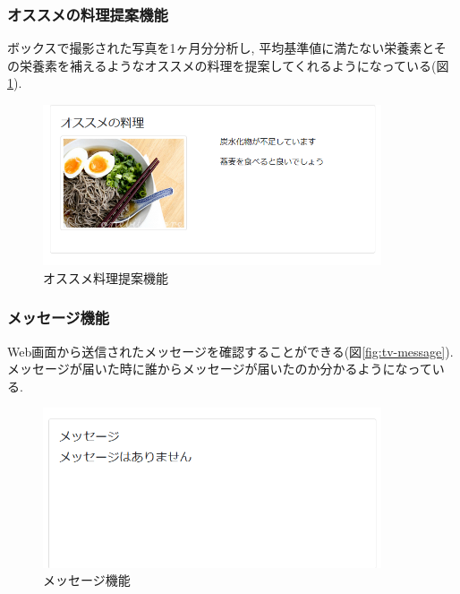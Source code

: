 \documentclass[../report]{subfiles}
\begin{document}
\subsubsection{オススメの料理提案機能}
ボックスで撮影された写真を1ヶ月分分析し, 平均基準値に満たない栄養素とその栄養素を補えるようなオススメの料理を提案してくれるようになっている(図\ref{fig:tv-suggestion}).
\begin{figure}[htbp]
    \begin{center}
        \includegraphics[width=10cm]{imgs/5_tv2.png}
        \caption{オススメ料理提案機能}
        \label{fig:tv-suggestion}
    \end{center}
\end{figure}

\subsubsection{メッセージ機能}
Web画面から送信されたメッセージを確認することができる(図\ref{fig:tv-message}).
メッセージが届いた時に誰からメッセージが届いたのか分かるようになっている.
\begin{figure}[htbp]
    \begin{center}
        \includegraphics[width=10cm]{imgs/5_tv3.png}
        \caption{メッセージ機能}
        \label{fig:tv-mesasge}
    \end{center}
\end{figure}
\end{document}
